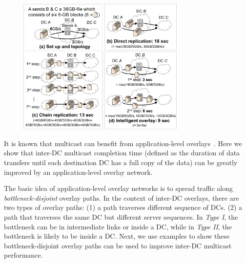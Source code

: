 \begin{figure}[t]
\centering
\includegraphics[width=84mm]{images/example-2.pdf}
\vspace{-0.4cm}
\label{fig:case:example}
\vspace{-0.4cm}
\end{figure}

It is known that multicast can
benefit from application-level overlays~\cite{chu2000case}.
Here we show that inter-DC multicast
completion time (defined as the duration of data transfers
until each destination DC has a full copy of the data)
can be greatly improved by an
application-level overlay network.

The basic idea of application-level overlay networks is
to spread traffic along {\em bottleneck-disjoint} overlay paths.
In the context of inter-DC overlays,
there are two types of overlay paths: (1) a path traverses different sequence of DCs. (2) a path that traverses the same DC but different server sequences. In {\em Type I}, the bottleneck can be in intermediate links or inside a DC, while in {\em Type II}, the bottleneck is likely to be inside a DC. 
Next, we use examples to show these bottleneck-disjoint overlay paths can be used to improve inter-DC multicast performance.

